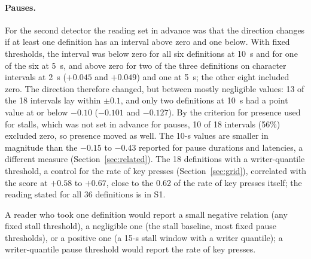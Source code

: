 \paragraph{Pauses.} For the second detector the reading set in advance was that the direction changes if at least one
definition has an interval above zero and one below. With fixed thresholds, the interval was below zero for all six
definitions at 10~s and for one of the six at 5~s, and above zero for two of the three definitions on character
intervals at 2~s ($+0.045$ and $+0.049$) and one at 5~s; the other eight included zero. The direction therefore
changed, but between mostly negligible values: 13 of the 18 intervals lay within $\pm 0.1$, and only two definitions at
10~s had a point value at or below $-0.10$ ($-0.101$ and $-0.127$). By the criterion for presence used for stalls, which was not
set in advance for pauses, 10 of 18 intervals (56\%) excluded zero, so presence moved as well. The 10-s values are
smaller in magnitude than the $-0.15$ to $-0.43$ reported for pause durations and latencies, a different measure
(Section~\ref{sec:related}). The 18 definitions with a writer-quantile threshold, a control for the rate of key presses
(Section~\ref{sec:grid}), correlated with the score at $+0.58$ to $+0.67$, close to the 0.62 of the rate of key presses
itself; the reading stated for all 36 definitions is in S1.

A reader who took one definition would report a small negative relation (any fixed stall threshold), a
negligible one (the stall baseline, most fixed pause thresholds), or a positive one (a 15-s stall window with a writer
quantile); a writer-quantile pause threshold would report the rate of key presses.

